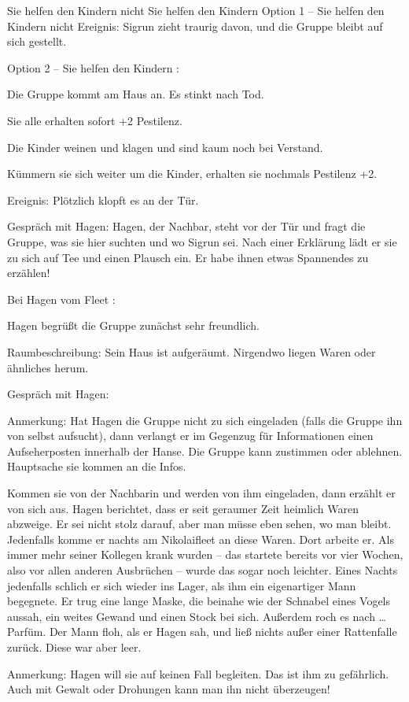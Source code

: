 Sie helfen den Kindern nicht
Sie helfen den Kindern
Option 1 – Sie helfen den Kindern nicht
Ereignis: Sigrun zieht traurig davon, und die Gruppe bleibt auf sich gestellt.


Option 2 – Sie helfen den Kindern
:

Die Gruppe kommt am Haus an. Es stinkt nach Tod.

Sie alle erhalten sofort +2 Pestilenz.

Die Kinder weinen und klagen und sind kaum noch bei Verstand.

Kümmern sie sich weiter um die Kinder, erhalten sie nochmals Pestilenz +2.

Ereignis: Plötzlich klopft es an der Tür.

Gespräch mit Hagen: Hagen, der Nachbar, steht vor der Tür und fragt die Gruppe, was sie hier suchten und wo Sigrun sei. Nach einer Erklärung lädt er sie zu sich auf Tee und einen Plausch ein. Er habe ihnen etwas Spannendes zu erzählen!

Bei Hagen vom Fleet
:

Hagen begrüßt die Gruppe zunächst sehr freundlich.

Raumbeschreibung: Sein Haus ist aufgeräumt. Nirgendwo liegen Waren oder ähnliches herum.

Gespräch mit Hagen:

Anmerkung: Hat Hagen die Gruppe nicht zu sich eingeladen (falls die Gruppe ihn von selbst aufsucht), dann verlangt er im Gegenzug für Informationen einen Aufseherposten innerhalb der Hanse. Die Gruppe kann zustimmen oder ablehnen. Hauptsache sie kommen an die Infos.

Kommen sie von der Nachbarin und werden von ihm eingeladen, dann erzählt er von sich aus.
Hagen berichtet, dass er seit geraumer Zeit heimlich Waren abzweige. Er sei nicht stolz darauf, aber man müsse eben sehen, wo man bleibt. Jedenfalls komme er nachts am Nikolaifleet an diese Waren. Dort arbeite er. Als immer mehr seiner Kollegen krank wurden – das startete bereits vor vier Wochen, also vor allen anderen Ausbrüchen – wurde das sogar noch leichter. Eines Nachts jedenfalls schlich er sich wieder ins Lager, als ihm ein eigenartiger Mann begegnete. Er trug eine lange Maske, die beinahe wie der Schnabel eines Vogels aussah, ein weites Gewand und einen Stock bei sich. Außerdem roch es nach … Parfüm. Der Mann floh, als er Hagen sah, und ließ nichts außer einer Rattenfalle zurück. Diese war aber leer.

Anmerkung: Hagen will sie auf keinen Fall begleiten. Das ist ihm zu gefährlich. Auch mit Gewalt oder Drohungen kann man ihn nicht überzeugen!

